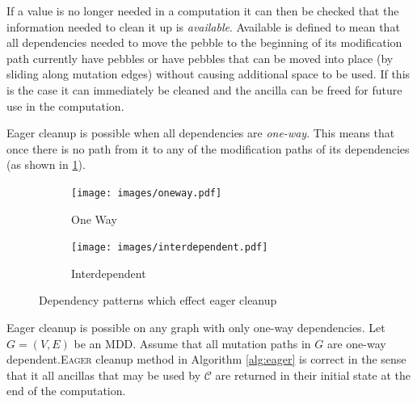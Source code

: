 If a value is no longer needed in a computation it can then be checked that the
information needed to clean it up is \emph{available}. Available is defined to
mean that all dependencies needed to move the pebble to the beginning of its
modification path currently have pebbles or have pebbles that can be moved into
place (by sliding along mutation edges) without causing additional space to be
used. If this is the case it can immediately be cleaned and the ancilla can be
freed for future use in the computation.

Eager cleanup is possible when all dependencies are \emph{one-way}.
This means that once there is no path from it to any of the modification paths
of its dependencies (as shown in \cref{fig:one-way}).

\begin{figure}
  \centering
  \begin{subfigure}[b]{0.3\textwidth}
    \texttt{[image: images/oneway.pdf]}
    \caption{One Way}
    \label{fig:one-way}
  \end{subfigure}
  \qquad
  \begin{subfigure}[b]{0.3\textwidth}
    \texttt{[image: images/interdependent.pdf]}
    \caption{Interdependent}
    \label{fig:interdep}
  \end{subfigure}
  \caption{Dependency patterns which effect eager cleanup}
\end{figure}


\begin{theorem}

Eager cleanup is possible on any graph with only one-way dependencies.  Let
$G=(V,E)$ be an MDD.  Assume that all mutation paths in $G$ are one-way
dependent.\textsc{Eager} cleanup method in Algorithm
\ref{alg:eager} is correct in the sense that it all
ancillas that may be used by ${\mathcal C}$ are returned in their initial state
at the end of the computation.

\end{theorem}

